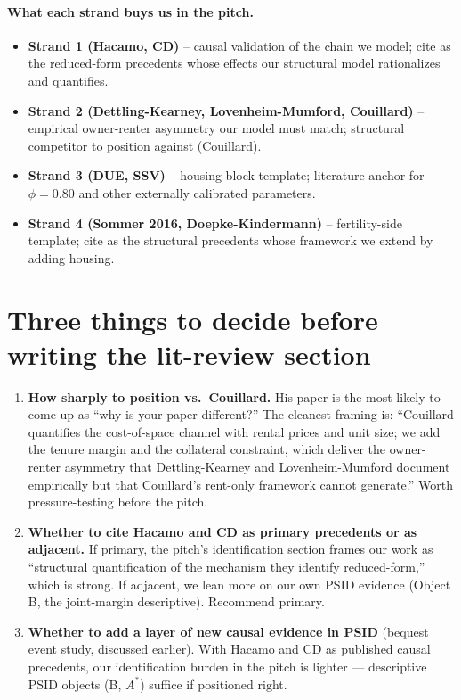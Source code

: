 \documentclass[11pt]{article}
\begin{document}
\paragraph{What each strand buys us in the pitch.}
\begin{itemize}
\item \textbf{Strand 1 (Hacamo, CD)} -- causal validation of the chain we model; cite as the reduced-form precedents whose effects our structural model rationalizes and quantifies.
\item \textbf{Strand 2 (Dettling-Kearney, Lovenheim-Mumford, Couillard)} -- empirical owner-renter asymmetry our model must match; structural competitor to position against (Couillard).
\item \textbf{Strand 3 (DUE, SSV)} -- housing-block template; literature anchor for $\phi = 0.80$ and other externally calibrated parameters.
\item \textbf{Strand 4 (Sommer 2016, Doepke-Kindermann)} -- fertility-side template; cite as the structural precedents whose framework we extend by adding housing.
\end{itemize}

\section{Three things to decide before writing the lit-review section}

\begin{enumerate}
\item \textbf{How sharply to position vs.\ Couillard.} His paper is the most likely to come up as ``why is your paper different?'' The cleanest framing is: ``Couillard quantifies the cost-of-space channel with rental prices and unit size; we add the tenure margin and the collateral constraint, which deliver the owner-renter asymmetry that Dettling-Kearney and Lovenheim-Mumford document empirically but that Couillard's rent-only framework cannot generate.'' Worth pressure-testing before the pitch.
\item \textbf{Whether to cite Hacamo and CD as primary precedents or as adjacent.} If primary, the pitch's identification section frames our work as ``structural quantification of the mechanism they identify reduced-form,'' which is strong. If adjacent, we lean more on our own PSID evidence (Object B, the joint-margin descriptive). Recommend primary.
\item \textbf{Whether to add a layer of new causal evidence in PSID} (bequest event study, discussed earlier). With Hacamo and CD as published causal precedents, our identification burden in the pitch is lighter --- descriptive PSID objects (B, $A^*$) suffice if positioned right.
\end{enumerate}
\end{document}
